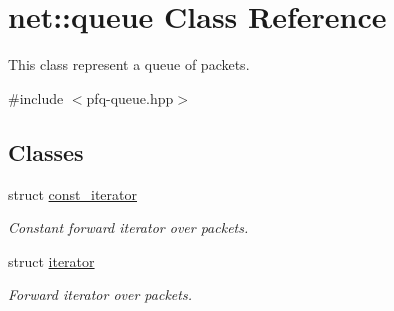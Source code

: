 \hypertarget{classnet_1_1queue}{\section{net\+:\+:queue Class Reference}
\label{classnet_1_1queue}
}


This class represent a queue of packets.  




{\ttfamily \#include $<$pfq-\/queue.\+hpp$>$}

\subsection*{Classes}
\begin{DoxyCompactItemize}
\item 
struct \hyperlink{structnet_1_1queue_1_1const__iterator}{const\+\_\+iterator}
\begin{DoxyCompactList}\small\item\em Constant forward iterator over packets. \end{DoxyCompactList}\item 
struct \hyperlink{structnet_1_1queue_1_1iterator}{iterator}
\begin{DoxyCompactList}\small\item\em Forward iterator over packets. \end{DoxyCompactList}\end{DoxyCompactItemize}
